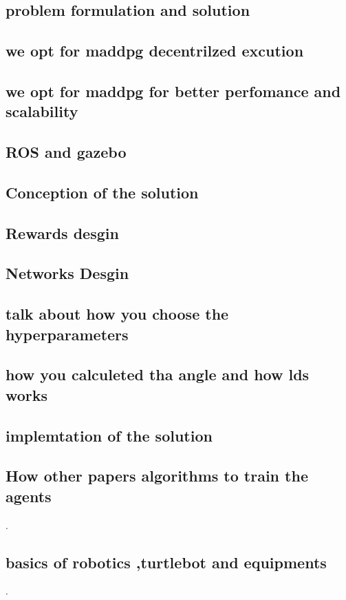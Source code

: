 \documentclass[12pt]{extarticle}
\begin{document}
\subsection{problem formulation and solution}
\subsection{we opt for maddpg decentrilzed excution }
\subsection{we opt for maddpg for better perfomance and scalability }


\subsection{ROS and gazebo}


\subsection{Conception of the solution}
  \subsection{Rewards desgin}
  \subsection{Networks Desgin}
  \subsection{talk about how you choose the hyperparameters}
  \subsection{how you calculeted tha angle and how lds works}
  

\subsection{implemtation of the solution}


\subsection{How other papers algorithms to train the agents }. 
\subsection{basics of robotics ,turtlebot and equipments}. 
\end{document}
